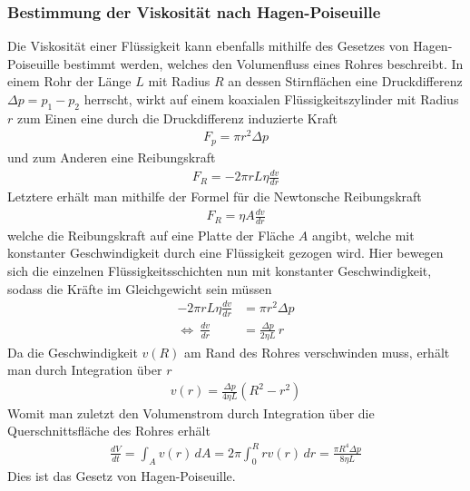 \documentclass[12pt,a4paper,german]{scrartcl}
\numberwithin{equation}{section}
\begin{document}
  \subsubsection{Bestimmung der Viskosität nach Hagen-Poiseuille}
  Die Viskosität einer Flüssigkeit kann ebenfalls mithilfe des Gesetzes von Hagen-Poiseuille bestimmt werden, welches den Volumenfluss eines Rohres beschreibt.
  In einem Rohr der Länge $L$ mit Radius $R$ an dessen Stirnflächen eine Druckdifferenz $\Delta p = p_1 - p_2$ herrscht, wirkt auf einem koaxialen Flüssigkeitszylinder mit Radius $r$ zum Einen eine durch die Druckdifferenz induzierte Kraft
  \begin{align}
    F_p = \pi r^2 \Delta p
    \label{eq_theo_hp_force_pressure_diff}
  \end{align}
  und zum Anderen eine Reibungskraft
  \begin{align}
    F_R = -2 \pi r L \eta \frac{d v}{d r}
    \label{eq_theo_hp_force_friction}
  \end{align}
  Letztere erhält man mithilfe der Formel für die Newtonsche Reibungskraft
  \begin{align}
    F_R = \eta A \frac{d v}{d r}
    \label{eq_theo_hp_friction_newton}
  \end{align}
  welche die Reibungskraft auf eine Platte der Fläche $A$ angibt, welche mit konstanter Geschwindigkeit durch eine Flüssigkeit gezogen wird.
  Hier bewegen sich die einzelnen Flüssigkeitsschichten nun mit konstanter Geschwindigkeit, sodass die Kräfte im Gleichgewicht sein müssen
  \begin{align}
    -2 \pi r L \eta \frac{d v}{d r} &= \pi r^2 \Delta p \nonumber \\
    \Leftrightarrow \ \frac{d v}{d r} &= \frac{\Delta p}{2 \eta L} \, r
    \label{eq_theo_hp_force_equilibrium}
  \end{align}
  Da die Geschwindigkeit $v(R)$ am Rand des Rohres verschwinden muss, erhält man durch Integration über $r$
  \begin{align}
    v(r) = \frac{\Delta p}{4 \eta L} (R^2 - r^2)
    \label{eq_theo_hp_velocity}
  \end{align}
  Womit man zuletzt den Volumenstrom durch Integration über die Querschnittsfläche des Rohres erhält
  \begin{align}
    \frac{d V}{d t} = \int_A v(r) \, d A = 2 \pi \int_0^R r v(r) \, dr
    = \frac{\pi R^4 \Delta p}{8 \eta L}
    \label{eq_theo_hp_hagen_poiseuille}
  \end{align}
  Dies ist das Gesetz von Hagen-Poiseuille.
\end{document}
